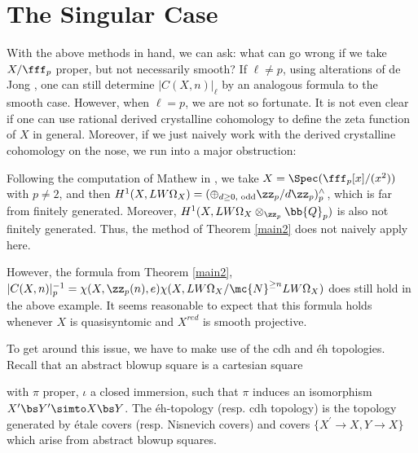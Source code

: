 \newpage
	\section{The Singular Case}
\indent \indent With the above methods in hand, we can ask: what can go wrong if we take $X/\fff_p$ proper, but not necessarily smooth?  If $\ell\neq p$, using alterations of de Jong \cite{alterations}, one can still determine $|C(X,n)|_{\ell}$ by an analogous formula to the smooth case.  However, when $\ell=p$, we are not so fortunate.  It is not even clear if one can use rational derived crystalline cohomology to define the zeta function of $X$ in general.  Moreover, if we just naively work with the derived crystalline cohomology on the nose, we run into a major obstruction:
\begin{example}
Following the computation of Mathew in \cite[~Theorem 10.4]{Mathew_2022}, we take $X=\Spec(\fff_p[x]/(x^2))$ with $p\neq 2$, and then $H^1(X,LW\Omega_X)=(\oplus_{d\geq 0,\text{ odd}}\zz_{p}/d\zz_{p})_p^{\wedge}$, which is far from finitely generated.  Moreover, $H^1(X,LW\Omega_{X}\otimes_{\zz_p}\bb{Q}_p)$ is also not finitely generated.  Thus, the method of Theorem \ref{main2} does not naively apply here.
\end{example}

\begin{remark}
However, the formula from Theorem \ref{main2}, $|C(X,n)|_p^{-1}=\chi(X,\zz_p(n),e)\chi(X,LW\Omega_{X}/\mc{N}^{\geq n}LW\Omega_{X})$ does still hold in the above example.  It seems reasonable to expect that this formula holds whenever $X$ is quasisyntomic and $X^{red}$ is smooth projective.
\end{remark}

To get around this issue, we have to make use of the cdh and \'{e}h topologies.  Recall that an abstract blowup square is a cartesian square
\begin{center}
\end{center}
with $\pi$ proper, $\iota$ a closed immersion, such that $\pi$ induces an isomorphism $X^{\prime}\bs Y^{\prime}\simto X\bs Y$.  The \'{e}h-topology (resp. cdh topology) is the topology generated by \'{e}tale covers (resp. Nisnevich covers) and covers $\{X^{\prime}\to X,Y\to X\}$ which arise from abstract blowup squares.

